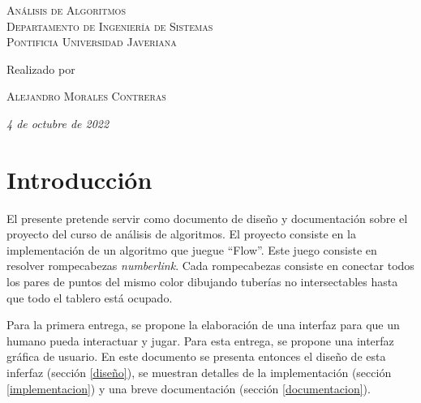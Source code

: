 \documentclass[letter,12pt]{article}
\begin{document}
\begin{titlepage}
	
	{\scshape\Large
	Análisis de Algoritmos \\
	Departamento de Ingeniería de Sistemas \\
	Pontificia Universidad Javeriana \\
	}  %
	
	\vspace*{3\baselineskip} %
	
	
	Realizado por
	
	\vspace{0.5\baselineskip} %
	
	{\scshape\Large Alejandro Morales Contreras} %
	
	\vspace{1\baselineskip} %
	
	\textit{4 de octubre de 2022} %
	
	\vfill
	
\end{titlepage}

\newpage

\tableofcontents

\newpage

\section{Introducción} \label{introduccion}

El presente pretende servir como documento de diseño y documentación sobre el proyecto del curso de análisis de algoritmos. El proyecto consiste en la implementación de un algoritmo que juegue ``Flow''. Este juego consiste en resolver rompecabezas \emph{numberlink}. Cada rompecabezas consiste en conectar todos los pares de puntos del mismo color dibujando tuberías no intersectables hasta que todo el tablero está ocupado. \par

Para la primera entrega, se propone la elaboración de una interfaz para que un humano pueda interactuar y jugar. Para esta entrega, se propone una interfaz gráfica de usuario. En este documento se presenta entonces el diseño de esta inferfaz (sección \ref{diseño}), se muestran detalles de la implementación (sección \ref{implementacion}) y una breve documentación (sección \ref{documentacion}). \par
\end{document}
